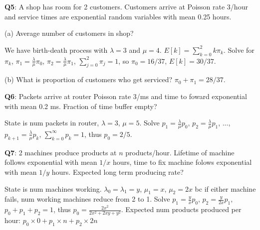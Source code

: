 \documentclass{scrartcl}
\begin{document}
\begin{multicols*}{3}
{\bf Q5}: A shop has room for 2 customers. Customers arrive at Poisson rate 3/hour and service times are exponential random variables with mean 0.25 hours.

(a) Average number of customers in shop?

We have birth-death process with $\lambda=3$ and $\mu=4$. $E[k] = \sum_{k=0}^2k\pi_k$. Solve for $\pi_k$, $\pi_1=\frac{\lambda}{\mu}\pi_0$, $\pi_2=\frac{\lambda}{\mu}\pi_1$, $\sum_{j=0}^2\pi_j=1$, so $\pi_0=16/37$, $E[k]=30/37$.

(b) What is proportion of customers who get serviced? $\pi_0+\pi_1=28/37$.



{\bf Q6}: Packets arrive at router Poisson rate 3/ms and time to foward exponential with mean 0.2 ms. Fraction of time buffer empty?

State is num packets in router, $\lambda=3$, $\mu=5$. Solve $p_1=\frac{\lambda}{\mu}p_0$, $p_2=\frac{\lambda}{\mu}p_1$, ..., $p_{k+1}=\frac{\lambda}{\mu}p_k$, $\sum_{k=0}^\infty p_k=1$, thus $p_0=2/5$.



{\bf Q7}: 2 machines produce products at $n$ products/hour. Lifetime of machine follows exponential with mean $1/x$ hours, time to fix machine folows exponential with mean $1/y$ hours. Expected long term producing rate?

State is num machines working. $\lambda_0=\lambda_1=y$, $\mu_1=x$, $\mu_2=2x$ bc if either machine fails, num working machines reduce from 2 to 1. Solve $p_1=\frac{y}{x}p_0$, $p_2=\frac{y}{2x}p_1$, $p_0+p_1+p_2=1$, thus $p_0=\frac{2x^2}{2x^2+2xy+y^2}$. Expected num products produced per hour: $p_0\times 0+p_1\times n+p_2\times 2n$


\end{multicols*}
\end{document}
